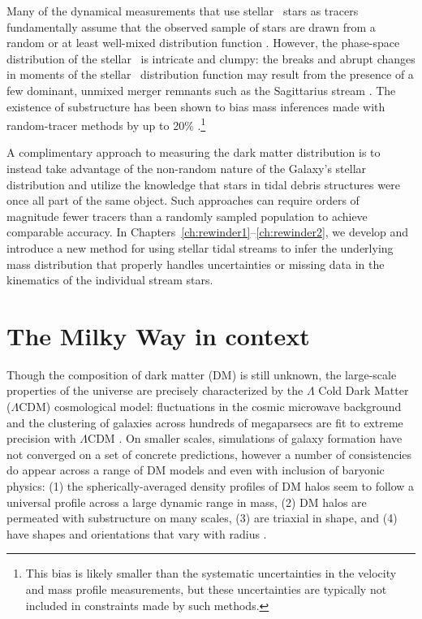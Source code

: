 Many of the dynamical measurements that use stellar \mwhalo\ stars as tracers
fundamentally assume that the observed sample of stars are drawn from a random
or at least well-mixed distribution function \citep[e.g.,][]{battaglia05,
kafle12, kafle14}. However, the phase-space distribution of the stellar \mwhalo\
is intricate and clumpy: the breaks and abrupt changes in moments of the stellar
\mwhalo\ distribution function may result from the presence of a few dominant,
unmixed merger remnants such as the Sagittarius stream \citep[which contains
almost as much stellar mass as the rest of the stellar \mwhalo\
combined;][]{niedersteostholt10}. The existence of substructure has been shown
to bias mass inferences made with random-tracer methods by up to 20\%
\citep{yencho06}.\footnote{This bias is likely smaller than the systematic
uncertainties in the velocity and mass profile measurements, but these
uncertainties are typically not included in constraints made by such methods.}

A complimentary approach to measuring the dark matter distribution is to instead
take advantage of the non-random nature of the Galaxy's stellar distribution and
utilize the knowledge that stars in tidal debris structures were once all part
of the same object. Such approaches can require orders of magnitude fewer
tracers than a randomly sampled population to achieve comparable accuracy. In
Chapters~\ref{ch:rewinder1}--\ref{ch:rewinder2}, we develop and introduce a new
method for using stellar tidal streams to infer the underlying mass distribution
that properly handles uncertainties or missing data in the kinematics of the
individual stream stars.

\section{The Milky Way in context} \label{sec:mw-context}

Though the composition of dark matter (DM) is still unknown, the large-scale
properties of the universe are precisely characterized by the $\Lambda$ Cold
Dark Matter ($\Lambda$CDM) cosmological model: fluctuations in the cosmic
microwave background and the clustering of galaxies across hundreds of
megaparsecs are fit to extreme precision with $\Lambda$CDM \citep{planck15,
sanchez12}. On smaller scales, simulations of galaxy formation have not
converged on a set of concrete predictions, however a number of consistencies do
appear across a range of DM models and even with inclusion of baryonic physics:
(1) the spherically-averaged density profiles of DM halos seem to follow a
universal profile across a large dynamic range in mass, (2) DM halos are
permeated with substructure on many scales, (3) are triaxial in shape, and (4)
have shapes and orientations that vary with radius \citep{dubinski91, navarro96,
jing02, kuhlen07, veraciro11}.


